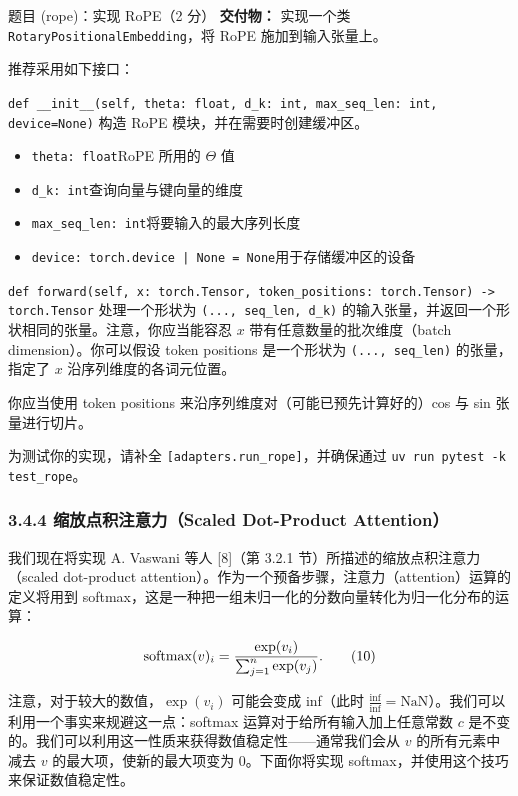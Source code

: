 \begin{problembox}{题目 (rope)：实现 RoPE（2 分）}
\textbf{交付物：} 实现一个类 \texttt{RotaryPositionalEmbedding}，将 RoPE 施加到输入张量上。

推荐采用如下接口：

\texttt{def \_\_init\_\_(self, theta: float, d\_k: int, max\_seq\_len: int, device=None)} 构造 RoPE 模块，并在需要时创建缓冲区。
\begin{itemize}[leftmargin=2.4em]
  \item \texttt{theta: float}\quad RoPE 所用的 $\Theta$ 值
  \item \texttt{d\_k: int}\quad 查询向量与键向量的维度
  \item \texttt{max\_seq\_len: int}\quad 将要输入的最大序列长度
  \item \texttt{device: torch.device | None = None}\quad 用于存储缓冲区的设备
\end{itemize}

\texttt{def forward(self, x: torch.Tensor, token\_positions: torch.Tensor) -> torch.Tensor} 处理一个形状为 \texttt{(..., seq\_len, d\_k)} 的输入张量，并返回一个形状相同的张量。注意，你应当能容忍 $x$ 带有任意数量的批次维度（batch dimension）。你可以假设 token positions 是一个形状为 \texttt{(..., seq\_len)} 的张量，指定了 $x$ 沿序列维度的各词元位置。

你应当使用 token positions 来沿序列维度对（可能已预先计算好的）cos 与 sin 张量进行切片。

为测试你的实现，请补全 \texttt{[adapters.run\_rope]}，并确保通过 \texttt{uv run pytest -k test\_rope}。
\end{problembox}

\subsubsection*{3.4.4 缩放点积注意力（Scaled Dot-Product Attention）}

我们现在将实现 A. Vaswani 等人 [8]（第 3.2.1 节）所描述的缩放点积注意力（scaled dot-product attention）。作为一个预备步骤，注意力（attention）运算的定义将用到 softmax，这是一种把一组未归一化的分数向量转化为归一化分布的运算：

\begin{equation*}
\operatorname{softmax}(v)_i = \frac{\exp(v_i)}{\sum_{j=1}^{n} \exp(v_j)}.
\tag{10}
\end{equation*}

注意，对于较大的数值，$\exp(v_i)$ 可能会变成 inf（此时 $\tfrac{\text{inf}}{\text{inf}} = \text{NaN}$）。我们可以利用一个事实来规避这一点：softmax 运算对于给所有输入加上任意常数 $c$ 是不变的。我们可以利用这一性质来获得数值稳定性——通常我们会从 $v$ 的所有元素中减去 $v$ 的最大项，使新的最大项变为 $0$。下面你将实现 softmax，并使用这个技巧来保证数值稳定性。

